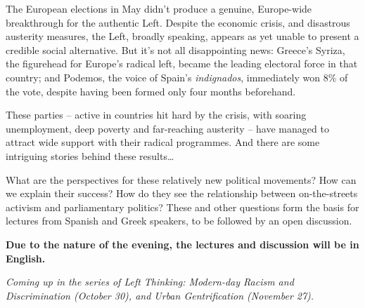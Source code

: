 \documentclass[12pt]{article}
\begin{document}
\vfill

The European elections in May didn't produce a genuine, Europe-wide
breakthrough for the authentic Left. Despite the economic crisis, and
disastrous austerity measures, the Left, broadly speaking, appears as yet
unable to present a credible social alternative. But it's not all disappointing news:
Greece's Syriza, the figurehead for Europe's radical left, became the
leading electoral force in that country; and Podemos, the voice of
Spain's \emph{indignados}, immediately won 8\% of the vote, despite having been formed
only four months beforehand.

These parties -- active in countries hit hard by the crisis, with soaring unemployment, 
deep poverty and far-reaching austerity -- have managed to attract wide support 
with their radical programmes. And there are some intriguing stories behind these 
results\dots

What are the perspectives for these relatively new political movements? How can 
we explain their success? How do they see the relationship between on-the-streets 
activism and parliamentary politics? These and other questions form the basis for 
lectures from Spanish and Greek speakers, to be followed by an 
open discussion.

\textbf{Due to the nature of the evening, the lectures and discussion will be in English.}

\emph{Coming up in the series of Left Thinking: Modern-day Racism and Discrimination
(October 30), and Urban Gentrification (November 27).}

\DolFooterLargeEn
\end{document}
